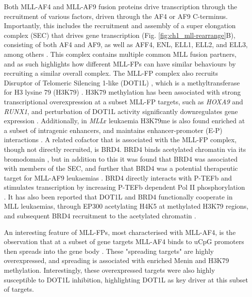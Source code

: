 Both MLL-AF4 and MLL-AF9 fusion proteins drive transcription through the recruitment of various factors, driven through the AF4 or AF9 C-terminus. Importantly, this includes the recruitment and assembly of a super elongation complex (SEC) that drives gene transcription (Fig. \ref{fig:ch1_mll-rearrange}B), consisting of both AF4 and AF9, as well as AFF4, ENL, ELL1, ELL2, and ELL3, among others \citep{lin_aff4_2010, smith_super_2011, lin_dynamic_2011, ballabio_molecular_2012, takahashi_molecular_2020, slany_mll_2020, yokoyama_higher-order_2010}. This complex contains multiple common MLL fusion partners, and as such highlights how different MLL-FPs can have similar behaviours by recruiting a similar overall complex. The MLL-FP complex also recruits Disruptor of Telomeric Silencing 1-like (DOT1L) \citep{bernt_mll-rearranged_2011, biswas_function_2011, lacoste_disruptor_2002, milne_leukemogenic_2005, okada_hdot1l_2005, mueller_role_2007, slany_mll_2020, lin_instructive_2016, krivtsov_h3k79_2008}, which is a methyltransferase for H3 lysine 79 (H3K79) \citep{steger_dot1lkmt4_2008}. H3K79 methylation has been associated with strong transcriptional overexpression at a subset MLL-FP targets, such as \textit{HOXA9} and \textit{RUNX1}, and perturbation of DOT1L activity significantly downregulates gene expression \citep{kerry_mll-af4_2017, godfrey_dot1l_2019, milne_leukemogenic_2005, wilkinson_runx1_2013}. Additionally, in \textit{MLL}r leukaemia H3K79me is also found enriched at a subset of intragenic enhancers, and maintains enhancer-promoter (E-P) interactions \citep{godfrey_dot1l_2019}. A related cofactor that is associated with the MLL-FP complex, though not directly recruited, is BRD4. BRD4 binds acetylated chromatin via its bromodomain \citep{dey_double_2003}, but in addition to this it was found that BRD4 was associated with members of the SEC, and further that BRD4 was a potential therapeutic target for MLL-AF9 leukaemias \citep{dawson_inhibition_2011, zuber_rnai_2011}. BRD4 directly interacts with P-TEFb and stimulates transcription by increasing P-TEFb dependent Pol II phosphorylation \citep{yang_recruitment_2005, jang_bromodomain_2005}. It has also been reported that DOT1L and BRD4 functionally cooperate in MLL leukaemias, through EP300 acetylating H4K5 at methylated H3K79 regions, and subsequent BRD4 recruitment to the acetylated chromatin \citep{gilan_functional_2016}. 

An interesting feature of MLL-FPs, most characterised with MLL-AF4, is the observation that at a subset of gene targets MLL-AF4 binds to uCpG promoters then spreads into the gene body \citep{kerry_mll-af4_2017}. These "spreading targets" are highly overexpressed, and spreading is associated with enriched Menin and H3K79 methylation. Interestingly, these overexpressed targets were also highly susceptible to DOT1L inhibition, highlighting DOT1L as key driver at this subset of targets.

